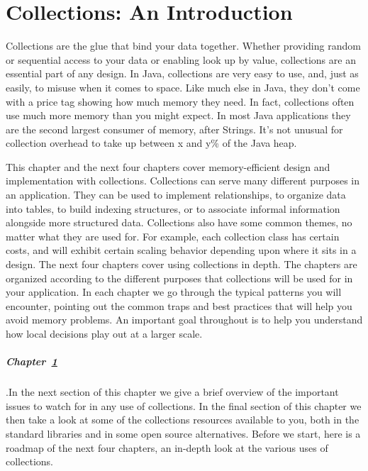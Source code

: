 \chapter{Collections: An Introduction}
\label{chapter:brief-introduction-collections}

Collections are the glue that bind your data together.  Whether 
providing random or sequential access to your data or enabling
look up by value, collections are an essential part of any
design. In Java, collections are very easy to use, and, just as easily, to misuse when
it comes to space. Like much else in Java, they don't come with a price tag
showing how much memory they need. In fact, collections
often use much more memory than you might expect. In most Java applications they are the second largest consumer of memory, after
Strings. It's not unusual for collection overhead to take up between x and y\%
of the Java heap.

This chapter and the next four chapters cover memory-efficient
design and implementation with collections.  Collections can serve many different
purposes in an application. They can be used to implement relationships, to organize data into tables, to build indexing structures, or to associate informal information alongside more structured
data. Collections also have some common themes, no
matter what they are used for. For example, each collection class has certain
costs, and will exhibit certain scaling behavior depending upon where it
sits in a design.  
The next four chapters cover using collections in depth. The chapters are
organized according to the different purposes that collections will be used
for in your application. In each chapter we go through the typical patterns you
will encounter, pointing out the common traps and best practices that will help you avoid memory problems. An
important goal throughout is to help you understand how local decisions
play out at a larger scale.  


\paragraph{Chapter~\ref{chapter:brief-introduction-collections}}.In the next section
of this chapter we give a brief overview of the important issues to watch for in any use of collections. In the final section
of this chapter we then take a look at some of the collections resources available to you,
both in the standard libraries and in some open source alternatives. Before we
start, here is a roadmap of the next four chapters, an in-depth look at the
various uses of collections.

